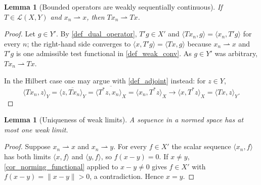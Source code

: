 \documentclass[a4paper]{report}
\theoremstyle{plain}
\newtheorem{lemma}[theorem]{Lemma}
\theoremstyle{definition}
\theoremstyle{remark}
\begin{document}
\begin{lemma}[Bounded operators are weakly sequentially continuous]
  \label{lem_weak_seq_cont}
  If $T \in \mathcal{L}(X,Y)$ and $x_n \rightharpoonup x$, then
  $Tx_n \rightharpoonup Tx$.
\end{lemma}
\begin{proof}
  Let $g \in Y'$.  By \cref{def_dual_operator}, $T'g \in X'$ and
  $\langle Tx_n, g\rangle = \langle x_n, T'g\rangle$ for every $n$; the right-hand side
  converges to $\langle x, T'g\rangle = \langle Tx, g\rangle$ because
  $x_n \rightharpoonup x$ and $T'g$ is one admissible test functional in
  \cref{def_weak_conv}.  As $g \in Y'$ was arbitrary, $Tx_n \rightharpoonup Tx$.

  In the Hilbert case one may argue with \cref{def_adjoint} instead: for $z \in Y$,
  \[
    \langle Tx_n, z\rangle_Y = \overline{\langle z, Tx_n\rangle_Y}
      = \overline{\langle T^*z, x_n\rangle_X} = \langle x_n, T^*z\rangle_X
      \longrightarrow \langle x, T^*z\rangle_X = \langle Tx, z\rangle_Y .
  \]
\end{proof}


\begin{lemma}[Uniqueness of weak limits]
  \label{lem_weak_limit_unique}
  A sequence in a normed space has at most one weak limit.
\end{lemma}
\begin{proof}
  Suppose $x_n \rightharpoonup x$ and $x_n \rightharpoonup y$.  For every $f \in X'$ the
  scalar sequence $\langle x_n,f\rangle$ has both limits $\langle x,f\rangle$ and
  $\langle y,f\rangle$, so $f(x-y) = 0$.  If $x \ne y$, \cref{cor_norming_functional}
  applied to $x - y \ne 0$ gives $f \in X'$ with $f(x-y) = \|x-y\| > 0$, a contradiction.
  Hence $x = y$.
\end{proof}
\end{document}

